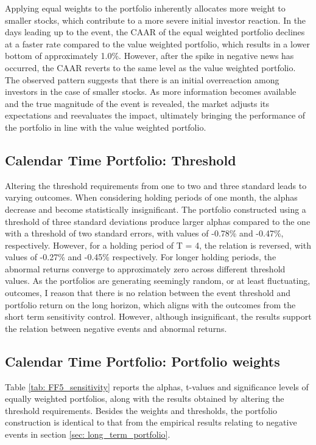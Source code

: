 Applying equal weights to the portfolio inherently allocates more weight to smaller stocks, which contribute to a more severe initial investor reaction. In the days leading up to the event, the CAAR of the equal weighted portfolio declines at a faster rate compared to the value weighted portfolio, which results in a lower bottom of approximately 1.0\%. However, after the spike in negative news has occurred, the CAAR reverts to the same level as the value weighted portfolio. The observed pattern suggests that there is an initial overreaction among investors in the case of smaller stocks. As more information becomes available and the true magnitude of the event is revealed, the market adjusts its expectations and reevaluates the impact, ultimately bringing the performance of the portfolio in line with the value weighted portfolio.

\subsection{Calendar Time Portfolio: Threshold}

Altering the threshold requirements from one to two and three standard leads to varying outcomes. When considering holding periods of one month, the alphas decrease and become statistically insignificant. The portfolio constructed using a threshold of three standard deviations produce larger alphas compared to the one with a threshold of two standard errors, with values of -0.78\% and -0.47\%, respectively. However, for a holding period of T = 4, the relation is reversed, with values of -0.27\% and -0.45\% respectively. For longer holding periods, the abnormal returns converge to approximately zero across different threshold values. As the portfolios are generating seemingly random, or at least fluctuating, outcomes, I reason that there is no relation between the event threshold and portfolio return on the long horizon, which aligns with the outcomes from the short term sensitivity control. However, although insignificant, the results support the relation between negative events and abnormal returns.  

\subsection{Calendar Time Portfolio: Portfolio weights}

Table \ref{tab: FF5_sensitivity} reports the alphas, t-values and significance levels of equally weighted portfolios, along with the results obtained by altering the threshold requirements. Besides the weights and thresholds, the portfolio construction is identical to that from the empirical results relating to negative events in section \ref{sec: long_term_portfolio}.   


